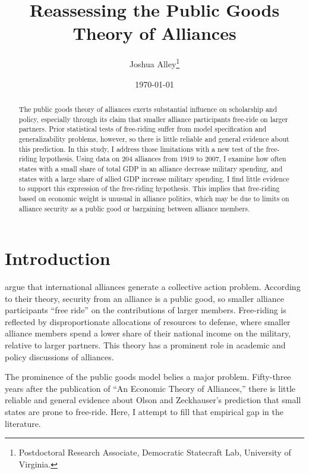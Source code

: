 \documentclass[12pt]{article}
\title{
\textbf{Reassessing the Public Goods Theory of Alliances}
	}
\author{Joshua Alley\footnote{Postdoctoral Research Associate,
Democratic Statecraft Lab, University of Virginia.}}
\date{{\normalsize \today}}
\begin{document}
\maketitle 

\doublespace

\begin{abstract}
The public goods theory of alliances exerts substantial influence on scholarship and policy, especially through its claim that smaller alliance participants free-ride on larger partners. 
Prior statistical tests of free-riding suffer from model specification and generalizability problems, however, so there is little reliable and general evidence about this prediction.
In this study, I address those limitations with a new test of the free-riding hypothesis. 
Using data on 204 alliances from 1919 to 2007, I examine how often states with a small share of total GDP in an alliance decrease military spending, and states with a large share of allied GDP increase military spending. 
I find little evidence to support this expression of the free-riding hypothesis. 
This implies that free-riding based on economic weight is unusual in alliance politics, which may be due to limits on alliance security as a public good or bargaining between alliance members. 
\end{abstract} 

\newpage


\section{Introduction}



\citet{OlsonZeckhauser1966} argue that international alliances generate a collective action problem. 
According to their theory, security from an alliance is a public good, so smaller alliance participants ``free ride'' on the contributions of larger members. 
Free-riding is reflected by disproportionate allocations of resources to defense, where smaller alliance members spend a lower share of their national income on the military, relative to larger partners.
This theory has a prominent role in academic and policy discussions of alliances. 


The prominence of the public goods model belies a major problem.
Fifty-three years after the publication of ``An Economic Theory of Alliances,'' there is little reliable and general evidence about Olson and Zeckhauser's prediction that small states are prone to free-ride. 
Here, I attempt to fill that empirical gap in the literature. 
\end{document}
